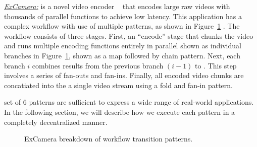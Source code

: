 	\noindent\underline{\textit{ExCamera:}} is a novel video encoder ~\cite{excamera} that
	encodes large raw videos with thousands of parallel functions to achieve
	low latency. This application has a complex workflow with use of multiple patterns, as shown in Figure~\ref{fig:excamera} .
	The workflow consists of three
	stages. First, an ``encode'' stage  that chunks the video and runs multiple encoding functions entirely in parallel shown as individual branches in Figure~\ref{fig:excamera}, shown as a map followed by chain pattern. Next, each branch $i$ combines results from the previous branch $(i-1)$ to 
	. This step involves a series of fan-outs and fan-ins. Finally, all encoded video chunks are concatiated into the a single video stream using a fold and fan-in pattern.


  set of 6 patterns are sufficient to express a wide range of real-world applications. In the following section, we will describe  how we execute each pattern in a completely decentralized manner.

\begin{figure}[t!]
	\centering
	\caption{ExCamera breakdown of workflow transition patterns. }
	\label{fig:excamera}
\end{figure}


